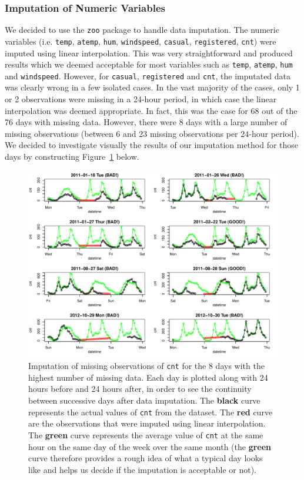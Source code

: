 \documentclass[12pt]{article}
\begin{document}
\subsubsection{Imputation of Numeric Variables}
We decided to use the \texttt{zoo} package to handle data imputation. The numeric variables (i.e. \texttt{temp}, \texttt{atemp}, \texttt{hum}, \texttt{windspeed}, \texttt{casual}, \texttt{registered}, \texttt{cnt}) were imputed using linear interpolation. This was very straightforward and produced results which we deemed acceptable for most variables such as \texttt{temp}, \texttt{atemp}, \texttt{hum} and \texttt{windspeed}. However, for \texttt{casual}, \texttt{registered} and \texttt{cnt}, the imputated data was clearly wrong in a few isolated cases. In the vast majority of the cases, only 1 or 2 observations were missing in a 24-hour period, in which case the linear interpolation was deemed appropriate. In fact, this was the case for 68 out of the 76 days with missing data. However, there were 8 days with a large number of missing observations (between 6 and 23 missing observations per 24-hour period). We decided to investigate visually the results of our imputation method for those days by constructing Figure~\ref{fig:badrows} below.
\begin{figure}[H]
	\centering
	\includegraphics[width=.98\textwidth]{figures/badrows.pdf}
	\caption{Imputation of missing observations of \texttt{cnt} for the 8 days with the highest number of missing data. Each day is plotted along with 24 hours before and 24 hours after, in order to see the continuity between successive days after data imputation. The {\textbf{\color{black}black}} curve represents the actual values of \texttt{cnt} from the dataset. The {\textbf{\color{red}red}} curve are the observations that were imputed using linear interpolation. The {\textbf{\color{green}green}} curve represents the average value of \texttt{cnt} at the same hour on the same day of the week over the same month (the {\textbf{\color{green}green}} curve therefore provides a rough idea of what a typical day looks like and helps us decide if the imputation is acceptable or not).}
	\label{fig:badrows}
\end{figure}
\end{document}
